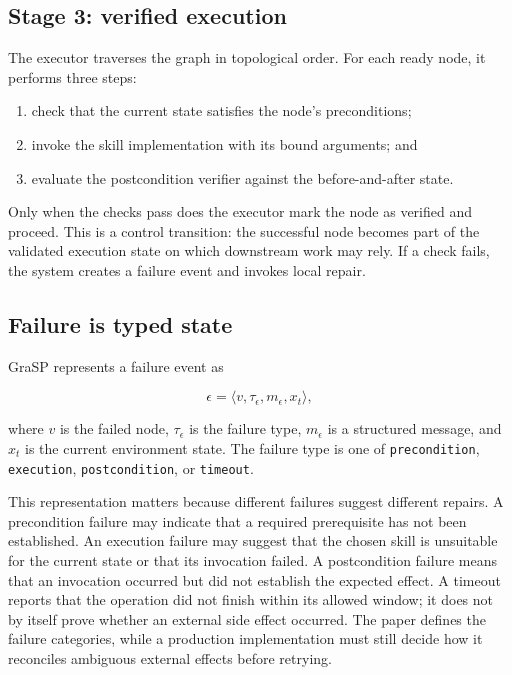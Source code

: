 \subsection{Stage 3: verified execution}

The executor traverses the graph in topological order. For each ready node, it performs three steps:

\begin{enumerate}
  \item check that the current state satisfies the node's preconditions;
  \item invoke the skill implementation with its bound arguments; and
  \item evaluate the postcondition verifier against the before-and-after state.
\end{enumerate}

Only when the checks pass does the executor mark the node as verified and proceed. This is a control transition: the successful node becomes part of the validated execution state on which downstream work may rely. If a check fails, the system creates a failure event and invokes local repair.\autocite{xia2026grasp}


\subsection{Failure is typed state}

GraSP represents a failure event as

\[
 \epsilon=\langle v,\tau_{\epsilon},m_{\epsilon},x_t\rangle,
\]

where \(v\) is the failed node, \(\tau_{\epsilon}\) is the failure type, \(m_{\epsilon}\) is a structured message, and \(x_t\) is the current environment state. The failure type is one of \texttt{precondition}, \texttt{execution}, \texttt{postcondition}, or \texttt{timeout}.\autocite{xia2026grasp}

This representation matters because different failures suggest different repairs. A precondition failure may indicate that a required prerequisite has not been established. An execution failure may suggest that the chosen skill is unsuitable for the current state or that its invocation failed. A postcondition failure means that an invocation occurred but did not establish the expected effect. A timeout reports that the operation did not finish within its allowed window; it does not by itself prove whether an external side effect occurred. The paper defines the failure categories, while a production implementation must still decide how it reconciles ambiguous external effects before retrying.

